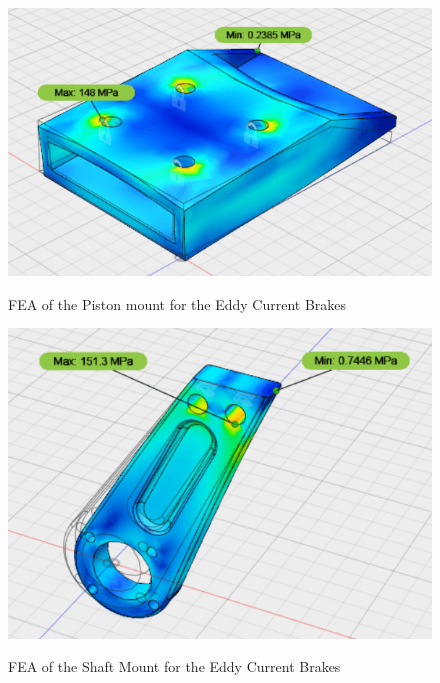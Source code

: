 \documentclass[main.tex]{subfiles}
\begin{document}
    \begin{figure}[H]
    	\centering
        \includegraphics[width =\linewidth]{images/ECPistonMount}
        \label{fig:ECPiston}
        \caption{FEA of the Piston mount for the Eddy Current Brakes}
    \end{figure}
    
    \begin{figure}[H]
    	\centering
        \includegraphics[width = \linewidth]{images/ShaftMount}
        \label{fig:ShafttMount}
        \caption{FEA of the Shaft Mount for the Eddy Current Brakes}
    \end{figure}
    
\end{document}
